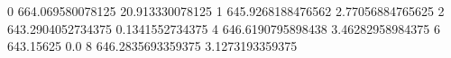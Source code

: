 0 664.069580078125 20.913330078125
1 645.9268188476562 2.77056884765625
2 643.2904052734375 0.1341552734375
4 646.6190795898438 3.46282958984375
6 643.15625 0.0
8 646.2835693359375 3.1273193359375
